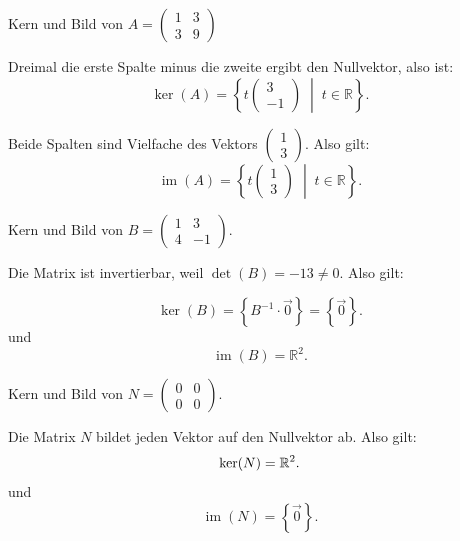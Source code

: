 \begin{bsp}
    {Kern und Bild von $A = \begin{pmatrix} 1 & 3 \\ 3 & 9 \end{pmatrix}$ }{}


Dreimal die erste Spalte minus die zweite ergibt den Nullvektor, also ist:
\[
\ker(A) = \left\{ t \begin{pmatrix} 3 \\ -1 \end{pmatrix} \;\middle|\; t \in \mathbb{R} \right\}.
\]

Beide Spalten sind Vielfache des Vektors $\begin{pmatrix} 1 \\ 3 \end{pmatrix}$.  
Also gilt:
\[
\operatorname{im}(A) = \left\{ t \begin{pmatrix} 1 \\ 3 \end{pmatrix} \;\middle|\; t \in \mathbb{R} \right\}.
\]

\end{bsp}

\begin{bsp}
{Kern und Bild von $B = \begin{pmatrix} 1 & 3 \\ 4 & -1 \end{pmatrix}.$}{}

Die Matrix ist invertierbar, weil $\det(B)  = -13 \neq 0$. 
Also gilt:

\[
\ker(B) = \left\{B^{-1}\cdot \vec{0} \right\} = \left\{ \vec{0} \right\}.
\]
und 
\[
\operatorname{im}(B)  = \mathbb{R}^2.
\]

\end{bsp}

\begin{bsp}
{Kern und Bild von $N = \begin{pmatrix} 0 & 0 \\ 0 & 0 \end{pmatrix}.$}{}

Die Matrix $N$ bildet jeden Vektor auf den Nullvektor ab.
Also gilt:
\[
\ker(N) = \mathbb{R}^2.
\]
und 
\[
\operatorname{im}(N)  = \left\{\vec{0}\right\}.
\]

\end{bsp}

